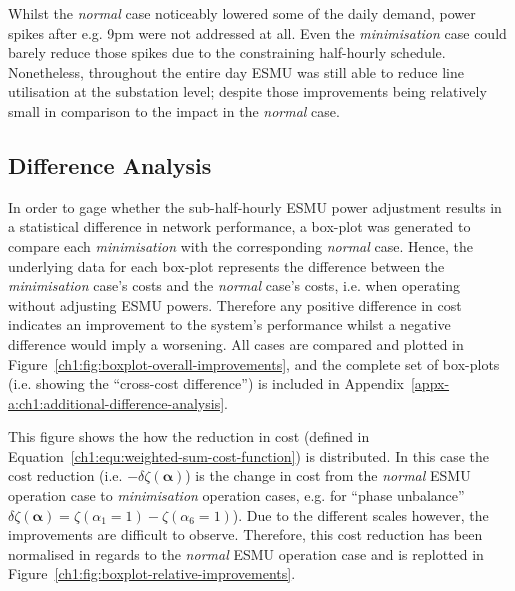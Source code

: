 

Whilst the \textit{normal} case noticeably lowered some of the daily demand, power spikes after e.g. 9pm were not addressed at all.
Even the \textit{minimisation} case could barely reduce those spikes due to the constraining half-hourly schedule.
Nonetheless, throughout the entire day ESMU was still able to reduce line utilisation at the substation level; despite those improvements being relatively small in comparison to the impact in the \textit{normal} case.

\subsection{Difference Analysis}
\label{ch1:subsec:difference-analysis}

In order to gage whether the sub-half-hourly ESMU power adjustment results in a statistical difference in network performance, a box-plot was generated to compare each \textit{minimisation} with the corresponding \textit{normal} case.
Hence, the underlying data for each box-plot represents the difference between the \textit{minimisation} case's costs and the \textit{normal} case's costs, i.e. when operating without adjusting ESMU powers.
Therefore any positive difference in cost indicates an improvement to the system's performance whilst a negative difference would imply a worsening.
All cases are compared and plotted in Figure~\ref{ch1:fig:boxplot-overall-improvements}, and the complete set of box-plots (i.e. showing the ``cross-cost difference'') is included in Appendix~\ref{appx-a:ch1:additional-difference-analysis}.



This figure shows the how the reduction in cost (defined in Equation~\ref{ch1:equ:weighted-sum-cost-function}) is distributed.
In this case the cost reduction (i.e. $-\delta\zeta(\boldsymbol{\alpha})$) is the change in cost from the \textit{normal} ESMU operation case to \textit{minimisation} operation cases, e.g. for ``phase unbalance'' $\delta\zeta(\boldsymbol{\alpha}) = \zeta(\alpha_1 = 1) - \zeta(\alpha_6 = 1)$).
Due to the different scales however, the improvements are difficult to observe.
Therefore, this cost reduction has been normalised in regards to the \textit{normal} ESMU operation case and is replotted in Figure~\ref{ch1:fig:boxplot-relative-improvements}.



